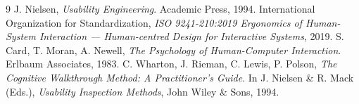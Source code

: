 \documentclass[11pt,a4paper]{article}
\begin{document}
\newpage
\begin{thebibliography}{9} 
 J. Nielsen, \textit{Usability Engineering}. Academic Press, 1994. 
 International Organization for Standardization, \textit{ISO 9241-210:2019 Ergonomics of Human-System Interaction — Human-centred Design for Interactive Systems}, 2019. 
 S. Card, T. Moran, A. Newell, \textit{The Psychology of Human-Computer Interaction}. Erlbaum Associates, 1983. 
 C. Wharton, J. Rieman, C. Lewis, P. Polson, \textit{The Cognitive Walkthrough Method: A Practitioner's Guide}. In J. Nielsen \& R. Mack (Eds.), \textit{Usability Inspection Methods}, John Wiley \& Sons, 1994.
\end{thebibliography}
\end{document}
